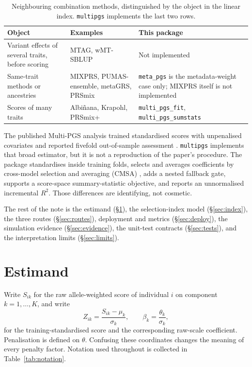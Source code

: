 \documentclass[11pt,a4paper]{article}
\newcommand{\code}[1]{\texttt{#1}}
\newcommand{\pkg}[1]{\texttt{#1}}
\newcommand{\Rtwo}{\(R^2\)}
\begin{document}
\begin{table}[ht]
\centering
\caption{Neighbouring combination methods, distinguished by the
  object in the linear index. \pkg{multipgs} implements the last
  two rows.}
\label{tab:neighbours}
\small
\begin{tabularx}{\linewidth}{@{}L{28mm}Y L{42mm}@{}}
\toprule
\textbf{Object} & \textbf{Examples} & \textbf{This package} \\
\midrule
Variant effects of several traits, before scoring &
MTAG, wMT-SBLUP & Not implemented \\
Same-trait methods or ancestries &
MIXPRS, PUMAS-ensemble, metaGRS, PRSmix &
\code{meta\_pgs} is the metadata-weight case only;
MIXPRS itself is not implemented \\
Scores of many traits &
Albi\~nana, Krapohl, PRSmix+ &
\code{multi\_pgs\_fit}, \code{multi\_pgs\_sumstats} \\
\bottomrule
\end{tabularx}
\end{table}

The published Multi-PGS analysis trained standardised scores with
unpenalised covariates and reported fivefold out-of-sample
assessment \cite{albinana2023}. \pkg{multipgs} implements that
broad estimator, but it is not a reproduction of the paper's
procedure. The package standardises inside training folds,
selects and averages coefficients by cross-model selection and
averaging (CMSA) \cite{prive2019}, adds a nested fallback gate,
supports a score-space summary-statistic objective, and reports
an unnormalised incremental \Rtwo{}. Those differences are
identifying, not cosmetic.

The rest of the note is the estimand (\S\ref{sec:estimand}), the
selection-index model (\S\ref{sec:index}), the three routes
(\S\ref{sec:routes}), deployment and metrics
(\S\ref{sec:deploy}), the simulation evidence
(\S\ref{sec:evidence}), the unit-test contracts
(\S\ref{sec:tests}), and the interpretation limits
(\S\ref{sec:limits}).

\section{Estimand}
\label{sec:estimand}

Write \(S_{ik}\) for the raw allele-weighted score of individual
\(i\) on component \(k=1,\ldots,K\), and write
\begin{equation}
  Z_{ik}=\frac{S_{ik}-\mu_k}{\sigma_k},
  \qquad
  \beta_k=\frac{\theta_k}{\sigma_k},
  \label{eq:standardization}
\end{equation}
for the training-standardised score and the corresponding
raw-scale coefficient. Penalisation is defined on \(\theta\).
Confusing these coordinates changes the meaning of every penalty
factor. Notation used throughout is collected in
Table~\ref{tab:notation}.
\end{document}
